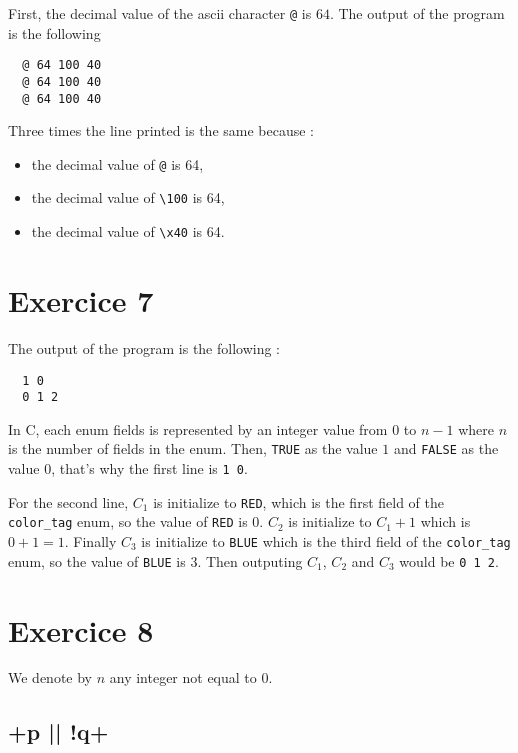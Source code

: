 \documentclass[a4paper,11pt]{report}
\begin{document}
First, the decimal value of the ascii character \verb+@+ is $64$. The output of
the program is the following

\begin{verbatim}
  @ 64 100 40
  @ 64 100 40
  @ 64 100 40
\end{verbatim}

Three times the line printed is the same because :

\begin{itemize}
\item the decimal value of \verb+@+ is 64,
\item the decimal value of \verb+\100+ is 64,
\item the decimal value of \verb+\x40+ is 64.
\end{itemize}

\section*{Exercice 7}

The output of the program is the following :

\begin{verbatim}
  1 0
  0 1 2
\end{verbatim}

In C, each enum fields is represented by an integer value from $0$ to $n-1$
where $n$ is the number of fields in the enum. Then, \verb+TRUE+ as the value
$1$ and \verb+FALSE+ as the value $0$, that's why the first line is \verb+1 0+.

For the second line, $C_1$ is initialize to \verb+RED+, which is the first field
of the \verb+color_tag+ enum, so the value of \verb+RED+ is $0$. $C_2$ is
initialize to $C_1 + 1$ which is $0 + 1 = 1$. Finally $C_3$ is initialize to
\verb+BLUE+ which is the third field of the \verb+color_tag+ enum, so the value
of \verb+BLUE+ is $3$. Then outputing $C_1$, $C_2$ and $C_3$ would be \verb+0 1 2+.

\section*{Exercice 8}

We denote by $n$ any integer not equal to $0$.

\subsection*{\cinline+p || !q+}
\end{document}
